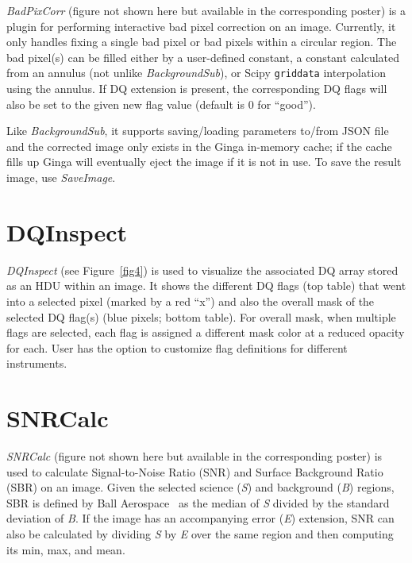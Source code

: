 \documentclass[11pt,twoside]{article}
\begin{document}
{\em BadPixCorr} (figure not shown here but available in the
corresponding poster) is a plugin for performing interactive bad pixel
correction on an image. Currently, it only handles fixing a single bad pixel or
bad pixels within a circular region.
The bad pixel(s) can be filled either by a user-defined constant, a constant
calculated from an annulus (not unlike {\em BackgroundSub}), or Scipy
{\tt griddata} interpolation using the annulus.
If DQ extension is present, the corresponding DQ flags will also be set
to the given new flag value (default is 0 for ``good'').


Like {\em BackgroundSub}, it supports saving/loading parameters to/from
JSON file and the corrected image only exists in the Ginga in-memory cache;
if the cache fills up Ginga will eventually eject the image if it is not
in use.  To save the result image, use {\em SaveImage}.

\section{DQInspect}

{\em DQInspect} (see Figure~\ref{fig4}) is used to visualize the associated DQ
array stored as an HDU within an image.
It shows the different DQ flags (top table) that went into a selected pixel
(marked by a red ``x'')
and also the overall mask of the selected DQ flag(s)
(blue pixels; bottom table).
For overall mask, when multiple flags are selected, each flag is assigned a
different mask color at a reduced opacity for each.
User has the option to customize flag definitions for different instruments.


\section{SNRCalc}

{\em SNRCalc} (figure not shown here but available in the
corresponding poster) is used to calculate Signal-to-Noise Ratio
(SNR) and Surface Background Ratio (SBR) on an image.
Given the selected science ({\em S}) and background ({\em B}) regions,
SBR is defined by Ball Aerospace~\citep{sbr} as the median of {\em S}
divided by the standard deviation of {\em B}.
If the image has an accompanying error ({\em E}) extension, SNR can also
be calculated by dividing {\em S} by {\em E} over the same region and
then computing its min, max, and mean.
\end{document}
